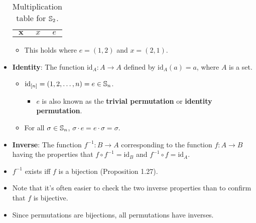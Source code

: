 \documentclass[../main.tex]{subfiles}
\begin{document}
\begin{itemize}
\begin{table}[h!]
\begin{tabular}{c|cc}
            $\bm{x}$ & $x$      & $e$\\
        \end{tabular}
        \caption{Multiplication table for $\mathbb{S}_2$.}
        \label{tab:S2MultiplicationTable}
    \end{table}
    \begin{itemize}
        \item This holds where $e=(1,2)$ and $x=(2,1)$.
    \end{itemize}
    \item \textbf{Identity}: The function $\text{id}_A:A\to A$ defined by $\text{id}_A(a)=a$, where $A$ is a set.
    \begin{itemize}
        \item $\text{id}_{[n]}=(1,2,\dots,n)=e\in\mathbb{S}_n$.
        \begin{itemize}
            \item $e$ is also known as the \textbf{trivial permutation} or \textbf{identity permutation}.
        \end{itemize}
        \item For all $\sigma\in\mathbb{S}_n$, $\sigma\cdot e=e\cdot\sigma=\sigma$.
    \end{itemize}
    \item \textbf{Inverse}: The function $f^{-1}:B\to A$ corresponding to the function $f:A\to B$ having the properties that $f\circ f^{-1}=\text{id}_B$ and $f^{-1}\circ f=\text{id}_A$.
    \item $f^{-1}$ exists iff $f$ is a bijection (Proposition 1.27).
    \item Note that it's often easier to check the two inverse properties than to confirm that $f$ is bijective.
    \item Since permutations are bijections, all permutations have inverses.
\end{itemize}
\end{document}
